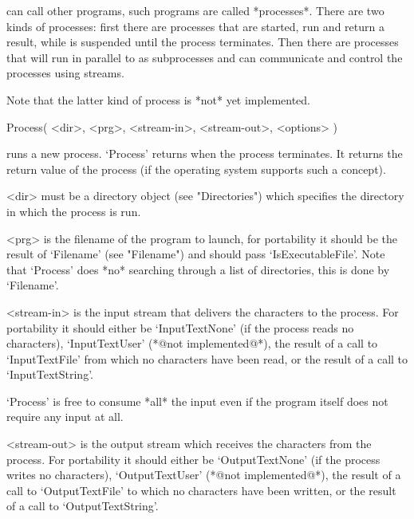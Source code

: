 


{\GAP}  can  call other programs,  such  programs are called *processes*.
There are  two  kinds of processes:  first there  are  processes that are
started, run and  return a result,  while  {\GAP} is suspended  until the
process  terminates.  Then there are  processes that will run in parallel
to {\GAP} as  subprocesses  and {\GAP} can  communicate and   control the
processes using streams.

Note that the latter kind of process is *not* yet implemented.


\>Process( <dir>, <prg>, <stream-in>, <stream-out>, <options> )

runs  a new process.  `Process' returns  when the process terminates.  It
returns the return value of the process (if the operating system supports
such a concept).

<dir> must be a directory  object (see "Directories") which specifies the
directory in which the process is run.

<prg> is the filename of the program to launch, for portability it should
be   the  result  of   `Filename'   (see   "Filename") and   should  pass
`IsExecutableFile'.  Note that  `Process'  does *no* searching through  a
list of directories, this is done by `Filename'.

<stream-in>  is the  input stream   that  delivers the characters  to the
process.   For portability it  should either  be `InputTextNone' (if  the
process reads  no characters), `InputTextUser' (*@not implemented@*), the
result  of a call to `InputTextFile'  from which  no characters have been
read, or the result of a call to `InputTextString'.

`Process' is  free to consume *all* the  input even if the program itself
does not require any input at all.

<stream-out> is the output stream  which receives the characters from the
process.  For portability it should   either be `OutputTextNone' (if  the
process writes  no  characters), `OutputTextUser' (*@not  implemented@*),
the result of a call to `OutputTextFile' to which no characters have been
written, or the result of a call to `OutputTextString'.

